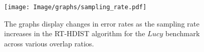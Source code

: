 \begin{figure}[t]
    \centering
    \texttt{[image: Image/graphs/sampling\_rate.pdf]}
    \caption{The graphs display changes in error rates as the sampling rate increases in the RT-HDIST algorithm for the $Lucy$ benchmark across various overlap ratios.}
    \label{fig:sampling_rate}
\end{figure}
